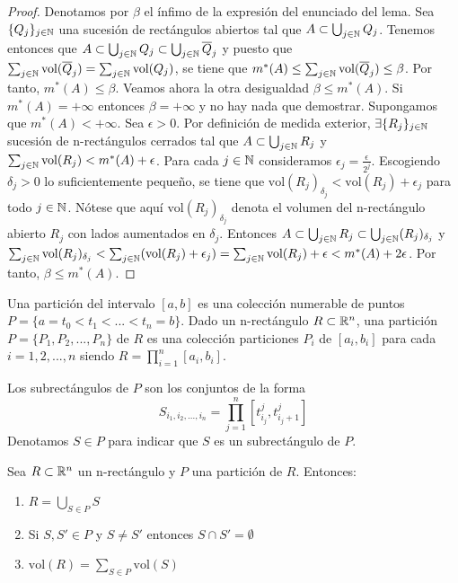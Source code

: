 \begin{proof}
    Denotamos por $\beta$ el ínfimo de la expresión del enunciado del lema. Sea $\{Q_j\}_{j \in \mathbb{N}}$ una sucesión de rectángulos abiertos tal que $A \subset \bigcup_{j \in \mathbb{N}} Q_j$. Tenemos entonces que $A \subset \bigcup_{j \in \mathbb{N}} Q_j \subset \bigcup_{j \in \mathbb{N}} \overline{Q}_j$ y puesto que $\sum_{j \in \mathbb{N}} \text{vol}(\overline{Q}_j) = \sum_{j \in \mathbb{N}} \text{vol}(Q_j)$, se tiene que $m^*(A) \leq \sum_{j \in \mathbb{N}} \text{vol}(\overline{Q}_j) \leq \beta$. Por tanto, $m^*(A) \leq \beta$. Veamos ahora la otra desigualdad $\beta \leq m^*(A)$. Si $m^*(A) = +\infty$ entonces $\beta = +\infty$ y no hay nada que demostrar. Supongamos que $m^*(A) < +\infty$. Sea $\epsilon > 0$. Por definición de medida exterior, $\exists \{R_j\}_{j \in \mathbb{N}}$ sucesión de n-rectángulos cerrados tal que $A \subset \bigcup_{j \in \mathbb{N}} R_j$ y $\sum_{j \in \mathbb{N}} \text{vol}(R_j) < m^*(A) + \epsilon$. Para cada $j \in \mathbb{N}$ consideramos $\epsilon_j = \frac{\epsilon}{2^j}$. Escogiendo $\delta_j > 0$ lo suficientemente pequeño, se tiene que $\text{vol}(R_j)_{\delta_j} < \text{vol}(R_j) + \epsilon_j$ para todo $j \in \mathbb{N}$. Nótese que aquí $\text{vol}(R_j)_{\delta_j}$ denota el volumen del n-rectángulo abierto $R_j$ con lados aumentados en $\delta_j$. Entonces $A \subset \bigcup_{j \in \mathbb{N}} R_j \subset \bigcup_{j \in \mathbb{N}} (R_j)_{\delta_j}$ y $\sum_{j \in \mathbb{N}} \text{vol}(R_j)_{\delta_j} < \sum_{j \in \mathbb{N}} (\text{vol}(R_j) + \epsilon_j) = \sum_{j \in \mathbb{N}} \text{vol}(R_j) + \epsilon < m^*(A) + 2\epsilon$. Por tanto, $\beta \leq m^*(A)$.
\end{proof}

\begin{definición} \label{Partición de un Conjunto}
    Una partición del intervalo $[a,b]$ es una colección numerable de puntos $P = \{a = t_0 < t_1 < ... < t_n = b\}$. Dado un n-rectángulo $R \subset \mathbb{R}^n$, una partición $P =  \{P_1, P_2, ..., P_n\}$ de $R$ es una colección particiones $P_i$ de $[a_i, b_i]$ para cada $i = 1, 2, ..., n$ siendo $R = \prod_{i=1}^n [a_i, b_i]$.
\end{definición}

Los subrectángulos de $P$ son los conjuntos de la forma 
    \begin{equation}
        S_{i_1, i_2, ..., i_n} = \prod_{j=1}^n [t_{i_j}^j, t_{i_j + 1}^j]
    \end{equation}
Denotamos $S \in P$ para indicar que $S$ es un subrectángulo de $P$.

\begin{lema} 
    Sea $R \subset \mathbb{R}^n$ un n-rectángulo y $P$ una partición de $R$. Entonces:
    \begin{enumerate}
        \item $R = \bigcup_{S \in P} S$
        \item Si $S, S' \in P$ y $S \neq S'$ entonces $S \cap S' = \emptyset$
        \item $\text{vol}(R) = \sum_{S \in P} \text{vol}(S)$
    \end{enumerate}
\end{lema}

